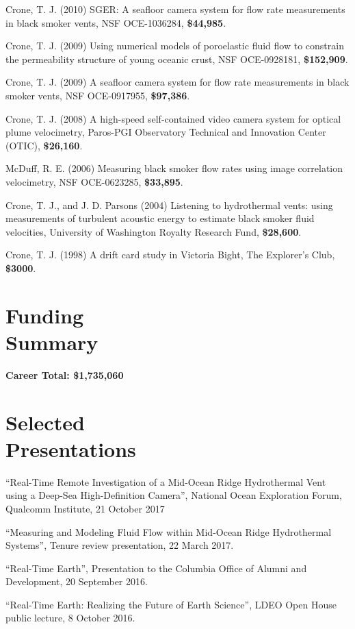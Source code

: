\documentclass[11pt]{res}
\begin{document}
\begin{resume}
Crone, T. J. (2010) SGER: A seafloor camera system for flow rate measurements in black smoker vents, NSF OCE-1036284, {\bf\$44,985}.

Crone, T. J. (2009) Using numerical models of poroelastic fluid flow to constrain the permeability structure of young oceanic crust, NSF OCE-0928181, {\bf\$152,909}.

Crone, T. J. (2009) A seafloor camera system for flow rate measurements in black smoker vents, NSF OCE-0917955, {\bf\$97,386}.

Crone, T. J. (2008) A high-speed self-contained video camera system for optical plume velocimetry, Paros-PGI Observatory Technical and Innovation Center (OTIC), {\bf\$26,160}.

McDuff, R. E. (2006) Measuring black smoker flow rates using image correlation velocimetry, NSF OCE-0623285, {\bf\$33,895}.

Crone, T. J., and J. D. Parsons (2004) Listening to hydrothermal vents: using measurements of turbulent acoustic energy to estimate black smoker fluid velocities, University of Washington Royalty Research Fund, {\bf\$28,600}.

Crone, T. J. (1998) A drift card study in Victoria Bight, The Explorer's Club, {\bf\$3000}.

\section{\sc Funding\\Summary}
{\bf Career Total: \$1,735,060}
\vspace{0.2in}

\section{\sc Selected\\Presentations}

``Real-Time Remote Investigation of a Mid-Ocean Ridge Hydrothermal Vent using a Deep-Sea High-Definition Camera'', National Ocean Exploration Forum, Qualcomm Institute, 21 October 2017

``Measuring and Modeling Fluid Flow within Mid-Ocean Ridge Hydrothermal Systems'', Tenure review presentation, 22 March 2017.

``Real-Time Earth'', Presentation to the Columbia Office of Alumni and Development, 20 September 2016.

``Real-Time Earth: Realizing the Future of Earth Science'', LDEO Open House public lecture, 8 October 2016.


\end{resume}
\end{document}
